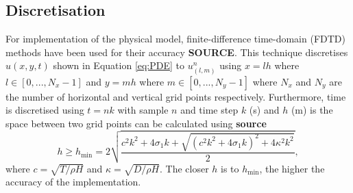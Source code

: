 \documentclass{vgtc}
\begin{document}
\subsection{Discretisation}
For implementation of the physical model, finite-difference time-domain (FDTD) methods have been used for their accuracy \textbf{SOURCE}. This technique discretises $u(x,y,t)$ shown in Equation \eqref{eq:PDE} to $u_{(l,m)}^n$ using $x=lh$ where $l \in [0, ..., N_x-1]$ and $y=mh$ where $m \in [0, ..., N_y-1]$ where $N_x$ and $N_y$ are the number of horizontal and vertical grid points respectively. Furthermore, time is discretised using $t = nk$ with sample $n$ and time step $k$ (s) and $h$ (m) is the space between two grid points can be calculated using \textbf{source} 
\begin{equation}\label{eq:h}
    h \geq h_\text{min} =  2\sqrt{\frac{c^2k^2 + 4\sigma_1k + \sqrt{(c^2k^2 + 4\sigma_1k)^2 + 4\kappa^2 k^2} }{2}},
\end{equation}
where $c = \sqrt{T/\rho H}$ and $\kappa = \sqrt{D/\rho H}$. The closer $h$ is to $h_\text{min}$, the higher the accuracy of the implementation.
\end{document}

